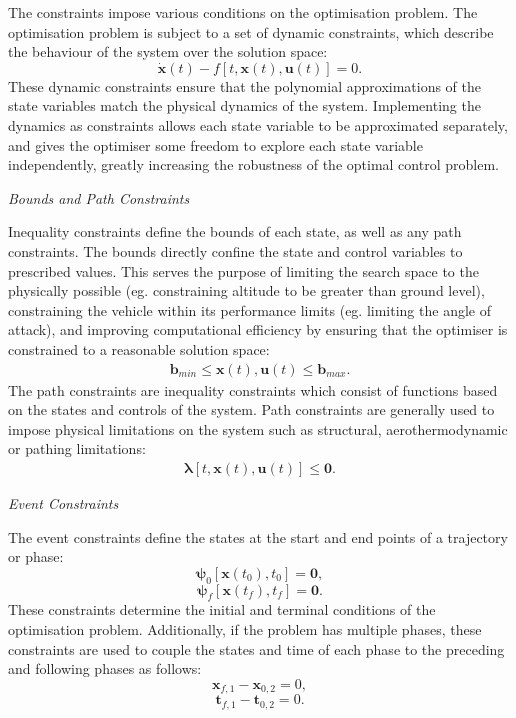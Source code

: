 \noindent The constraints impose various conditions on the optimisation problem.
The optimisation problem is subject to a set of dynamic constraints, which describe the behaviour of the system over the solution space:
\begin{equation} \label{eq:state}
\dot{\textbf{x}}(t) - f[t,\textbf{x}(t),\textbf{u}(t)] = 0.
\end{equation}
These dynamic constraints ensure that the polynomial approximations of the state variables match the physical dynamics of the system. Implementing the dynamics as constraints allows each state variable to be approximated separately, and gives the optimiser some freedom to explore each state variable independently, greatly increasing the robustness of the optimal control problem.



\noindent \textit{Bounds and Path Constraints}

\noindent Inequality constraints define the bounds of each state, as well as any path constraints.
The bounds directly confine the state and control variables to prescribed values. This serves the purpose of limiting the search space to the physically possible (eg. constraining altitude to be greater than ground level), constraining the vehicle within its performance limits (eg. limiting the angle of attack), and improving computational efficiency by ensuring that the optimiser is constrained to a reasonable solution space:
\begin{eqnarray}
\mathbf{b}_{min} \leq \textbf{x}(t),\textbf{u}(t) \leq \mathbf{b}_{max}.
\end{eqnarray}
The path constraints are inequality constraints which consist of functions based on the states and controls of the system. Path constraints are generally used to impose physical limitations on the system such as structural, aerothermodynamic or pathing limitations:
\begin{eqnarray}
\mathbf{\lambda}[t,\textbf{x}(t),\textbf{u}(t)] \leq \textbf{0}.
\end{eqnarray}

\noindent \textit{Event Constraints}

\noindent The event constraints define the states at the start and end points of a trajectory or phase:
\begin{equation}
\mathbf{\psi}_0[\textbf{x}(t_{0}), t_{0}] = \textbf{0},
\end{equation}
\begin{equation} \label{eq:2}
\mathbf{\psi}_f[\textbf{x}(t_{f}), t_{f}] = \textbf{0}.
\end{equation}
These constraints determine the initial and terminal conditions of the optimisation problem. Additionally, if the problem has multiple phases, these constraints are used to couple the states and time of each phase to the preceding and following phases as follows:
\begin{equation}
\textbf{x}_{f,1} - \textbf{x}_{0,2} = 0,
\end{equation}
\begin{equation}
\textbf{t}_{f,1} - \textbf{t}_{0,2} = 0.
\end{equation}






